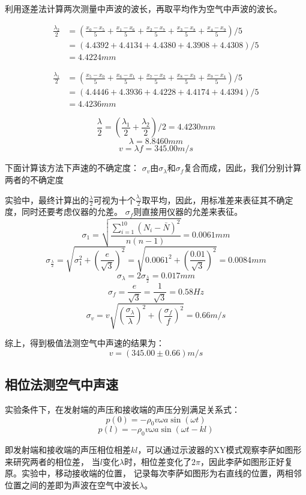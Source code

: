 \documentclass{article}
\begin{document}
    利用逐差法计算两次测量中声波的波长，再取平均作为空气中声波的波长。
    
    $$
    \begin{aligned}
        \frac{\lambda_2}{2}&=(\frac{x_0-x_5}{5}+\frac{x_1-x_6}{5}+\frac{x_2-x_7}{5}+\frac{x_3-x_8}{5}+\frac{x_4-x_9}{5})/5 \\
        &= (4.4392+4.4134+4.4380+4.3908+4.4308)/5 \\
        &= 4.4224 mm
    \end{aligned}
    $$

    $$
    \begin{aligned}
        \frac{\lambda_1}{2}&=(\frac{x_5-x_0}{5}+\frac{x_6-x_1}{5}+\frac{x_7-x_2}{5}+\frac{x_8-x_3}{5}+\frac{x_9-x_4}{5})/5 \\
        &= (4.4446+4.3936+4.4228+4.4174+4.4394)/5 \\
        &= 4.4236 mm
    \end{aligned}
    $$

    $$\frac{\lambda}{2}=(\frac{\lambda_1}{2}+\frac{\lambda_2}{2})/2=4.4230mm$$
    $$\lambda=8.8460mm$$
    $$v=\lambda f=345.00m/s$$

    下面计算该方法下声速的不确定度：
    $\sigma_v$由$\sigma_\lambda$和$\sigma_f$复合而成，因此，我们分别计算两者的不确定度
    
    实验中，最终计算出的$\frac{\lambda}{2}$可视为十个$\frac{\lambda_i}{2}$取平均，因此，用标准差来表征其不确定度，同时还要考虑仪器的允差。
    $\sigma_f$则直接用仪器的允差来表征。
    $$\sigma_1=\sqrt{\frac{\sum_{i=1}^{10} (N_i-\bar{N})^2}{n(n-1)}}=0.0061mm$$
    $$\sigma_{\frac{\lambda}{2}}=\sqrt{\sigma_1^2+(\frac{e}{\sqrt{3}})^2}=\sqrt{0.0061^2+(\frac{0.01}{\sqrt{3}})^2}=0.0084mm$$
    $$\sigma_\lambda=2\sigma_{\frac{\lambda}{2}}=0.017mm$$
    $$\sigma_f=\frac{e}{\sqrt{3}}=\frac{1}{\sqrt{3}}=0.58Hz$$
    $$\sigma_v=v\sqrt{(\frac{\sigma_\lambda}{\lambda})^2+(\frac{\sigma_f}{f})^2}=0.66m/s$$

    综上，得到极值法测空气中声速的结果为：
    $$v=(345.00\pm0.66)m/s$$

    \subsection{相位法测空气中声速}
    实验条件下，在发射端的声压和接收端的声压分别满足关系式：
    $$p(0)=-\rho_0 v \omega a \sin(\omega t)$$
    $$p(l)=-\rho_0 v \omega a \sin(\omega t-kl)$$

    即发射端和接收端的声压相位相差$kl$，可以通过示波器的XY模式观察李萨如图形来研究两者的相位差，
    当$l$变化$\lambda$时，相位差变化了$2\pi$，因此李萨如图形正好复原。实验中，移动接收端的位置，
    记录每次李萨如图形为右直线的位置，两相邻位置之间的差即为声波在空气中波长$\lambda$。
\end{document}
